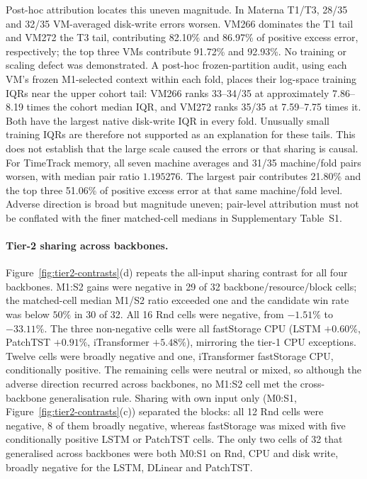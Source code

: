 \documentclass[a4paper,fleqn]{cas-dc}
\begin{document}
Post-hoc attribution locates this uneven magnitude. In Materna T1/T3,
28/35 and 32/35 VM-averaged disk-write errors worsen. VM266 dominates the T1
tail and VM272 the T3 tail, contributing 82.10\% and 86.97\% of positive
excess error, respectively; the top three VMs contribute 91.72\% and 92.93\%.
No training or scaling defect was demonstrated. A post-hoc frozen-partition
audit, using each VM's frozen M1-selected context within each fold, places
their log-space training IQRs near the upper cohort tail: VM266 ranks
33--34/35 at approximately 7.86--8.19 times the cohort median IQR, and VM272
ranks 35/35 at 7.59--7.75 times it. Both have the largest native disk-write
IQR in every fold. Unusually small training IQRs are therefore not supported as an
explanation for these tails. This does not establish that the large scale
caused the errors or that sharing is causal.
For TimeTrack memory, all seven machine averages and 31/35 machine/fold
pairs worsen, with median pair ratio $1.195276$. The largest pair contributes
21.80\% and the top three 51.06\% of positive excess error at that same
machine/fold level. Adverse direction is broad but magnitude uneven;
pair-level attribution must not be
conflated with the finer matched-cell medians in Supplementary Table~S1.

\paragraph{Tier-2 sharing across backbones.}
Figure~\ref{fig:tier2-contrasts}(d) repeats the all-input sharing contrast
for all four backbones. M1:S2 gains were negative in 29 of 32
backbone/resource/block cells; the matched-cell median M1/S2 ratio exceeded
one and the candidate win rate was below $50\%$ in 30 of 32. All 16 Rnd cells
were negative, from $-1.51\%$ to $-33.11\%$. The three non-negative cells were
all fastStorage CPU (LSTM $+0.60\%$, PatchTST $+0.91\%$, iTransformer
$+5.48\%$), mirroring the tier-1 CPU exceptions. Twelve cells were broadly
negative and one, iTransformer fastStorage CPU, conditionally positive. The
remaining cells were neutral or mixed, so although the adverse direction
recurred across backbones, no M1:S2 cell met the cross-backbone
generalisation rule. Sharing with own input only (M0:S1,
Figure~\ref{fig:tier2-contrasts}(c)) separated the blocks: all 12 Rnd cells
were negative, 8 of them broadly negative, whereas fastStorage was mixed with
five conditionally positive LSTM or PatchTST cells. The only two cells of
32 that generalised across backbones were both M0:S1 on Rnd, CPU and disk
write, broadly negative for the LSTM, DLinear and PatchTST.
\end{document}
